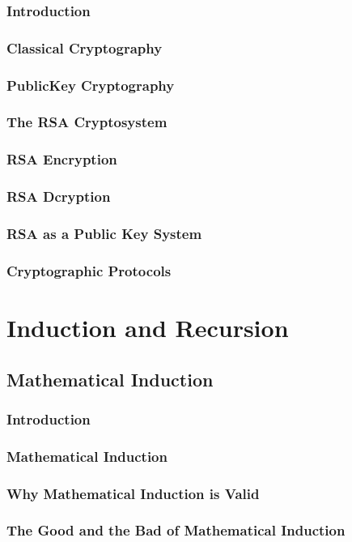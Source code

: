 \documentclass[11pt]{book}
\begin{document}
  \subsection{Introduction}
  \subsection{Classical Cryptography}
  \subsection{PublicKey Cryptography}
  \subsection{The RSA Cryptosystem}
  \subsection{RSA Encryption}
  \subsection{RSA Dcryption}
  \subsection{RSA as a Public Key System}
  \subsection{Cryptographic Protocols}
  
 
\chapter{Induction and Recursion}
 \section{Mathematical Induction}
  \subsection{Introduction}
  \subsection{Mathematical Induction}
  \subsection{Why Mathematical Induction is Valid}
  \subsection{The Good and the Bad of Mathematical Induction}
\end{document}
